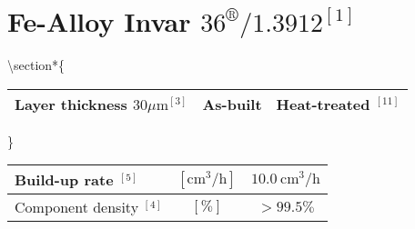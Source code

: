 \documentclass[10pt]{article}
\begin{document}
\section*{Fe-Alloy Invar $36^{\circledR} / 1.3912^{[1]}$}
\textbackslash section*\{\begin{tabular}{|l|l|l|}
\hline
Layer thickness $30 \mu \mathrm{m}^{[3]}$ & As-built & Heat-treated ${ }^{[11]}$ \\
\hline
\end{tabular}\}

\begin{center}
\begin{tabular}{|l|c|c|}
\hline
Build-up rate ${ }^{[5]}$ & $\left[\mathrm{cm}^{3} / \mathrm{h}\right]$ & $10.0 \mathrm{~cm}^{3} / \mathrm{h}$ \\
\hline
Component density ${ }^{[4]}$ & $[\%]$ & $>99.5 \%$ \\
\hline
\end{tabular}
\end{center}
\end{document}
